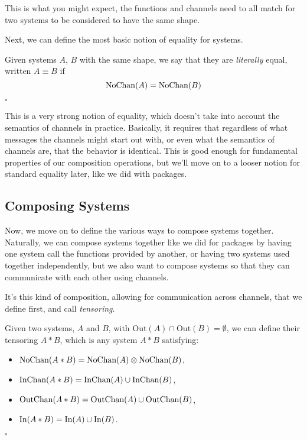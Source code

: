 This is what you might expect, the functions and channels need to all
match for two systems to be considered to have the same shape.

Next, we can define the most basic notion of equality for systems.

\begin{definition}
  Given systems $A$, $B$ with the same shape, we say that they are \emph{literally} equal, written $A \equiv B$ if
  $$
  \text{NoChan}(A) = \text{NoChan}(B)
  $$

  $\square$
\end{definition}

This is a very strong notion of equality, which doesn't take
into account the semantics of channels in practice.
Basically, it requires that regardless of what messages the channels
might start out with, or even what the semantics of channels are,
that the behavior is identical.
This is good enough for fundamental properties of our composition
operations, but we'll move on to a looser notion for standard equality
later, like we did with packages.

\subsection{Composing Systems}

Now, we move on to define the various ways to compose systems together.
Naturally, we can compose systems together like we did for packages
by having one system call the functions provided by another,
or having two systems used together independently,
but we also want to compose systems so that they can communicate
with each other using channels.

It's this kind of composition, allowing for communication across
channels, that we define first, and call \emph{tensoring}.

\begin{definition}
Given two systems, $A$ and $B$, with \(\text{Out}(A) \cap \text{Out}(B) = \emptyset\), we can define their tensoring $A * B$,
which is any system $A * B$ satisfying:
\begin{itemize}
  \item $\text{NoChan}(A * B) = \text{NoChan}(A) \otimes \text{NoChan}(B)$,
  \item $\text{InChan}(A * B) = \text{InChan}(A) \cup \text{InChan}(B)$,
  \item $\text{OutChan}(A * B) = \text{OutChan}(A) \cup \text{OutChan}(B)$,
  \item $\text{In}(A * B) = \text{In}(A) \cup \text{In}(B)$.
\end{itemize}

$\square$
\end{definition}

